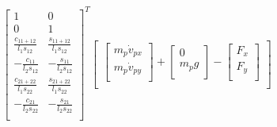 \documentclass[12pt,a4paper]{article}
\begin{document}
\begin{equation}
\begin{bmatrix}
1 & 0 \\
0 & 1 \\
\frac{c_{11+12}}{l_1 s_{12}} & \frac{s_{11+12}}{l_1 s_{12}} \\
-\frac{c_{11}}{l_2 s_{12}} & -\frac{s_{11}}{l_2 s_{12}} \\
\frac{c_{21+22}}{l_1 s_{22}} & \frac{s_{21+22}}{l_1 s_{22}} \\
-\frac{c_{21}}{l_2 s_{22}} & -\frac{s_{21}}{l_2 s_{22}} \\
\end{bmatrix}^T
\begin{bmatrix}
	\begin{bmatrix}
	m_p \dot{v}_{px}  \\
	m_p \dot{v}_{py} \\
	\end{bmatrix}
	+
	\begin{bmatrix}
	0 \\
	m_p g \\
	\end{bmatrix}
	-
	\begin{bmatrix}
	F_x \\
	F_y \\
	\end{bmatrix}	 \\		
	

\end{bmatrix}
\end{equation}
\end{document}
